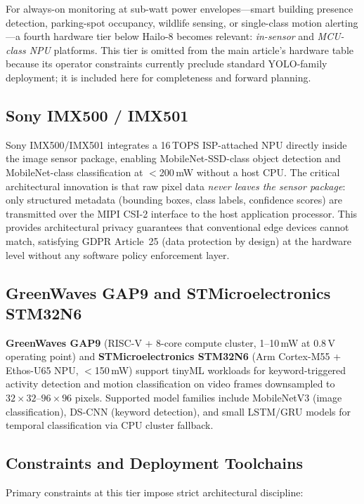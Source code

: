 \documentclass[11pt,a4paper]{article}
\begin{document}
\noindent For always-on monitoring at sub-watt power envelopes---smart
building presence detection, parking-spot occupancy, wildlife sensing,
or single-class motion alerting---a fourth hardware tier below
Hailo-8 becomes relevant: \emph{in-sensor} and \emph{MCU-class NPU}
platforms. This tier is omitted from the main article's hardware table
because its operator constraints currently preclude standard YOLO-family
deployment; it is included here for completeness and forward planning.

\subsection{Sony IMX500 / IMX501}

Sony IMX500/IMX501 integrates a 16\,TOPS ISP-attached NPU directly
inside the image sensor package, enabling MobileNet-SSD-class object
detection and MobileNet-class classification at $<$200\,mW without
a host CPU. The critical architectural innovation is that raw pixel
data \emph{never leaves the sensor package}: only structured metadata
(bounding boxes, class labels, confidence scores) are transmitted over
the MIPI CSI-2 interface to the host application processor. This
provides architectural privacy guarantees that conventional edge
devices cannot match, satisfying GDPR Article~25 (data protection
by design) at the hardware level without any software policy
enforcement layer.

\subsection{GreenWaves GAP9 and STMicroelectronics STM32N6}

\textbf{GreenWaves GAP9} (RISC-V + 8-core compute cluster,
1--10\,mW at 0.8\,V operating point) and \textbf{STMicroelectronics
STM32N6} (Arm Cortex-M55 + Ethos-U65 NPU, $<$150\,mW) support
tinyML workloads for keyword-triggered activity detection and
motion classification on video frames downsampled to
$32{\times}32$--$96{\times}96$ pixels. Supported model families
include MobileNetV3 (image classification), DS-CNN (keyword
detection), and small LSTM/GRU models for temporal classification
via CPU cluster fallback.

\subsection{Constraints and Deployment Toolchains}

Primary constraints at this tier impose strict architectural discipline:
\end{document}
